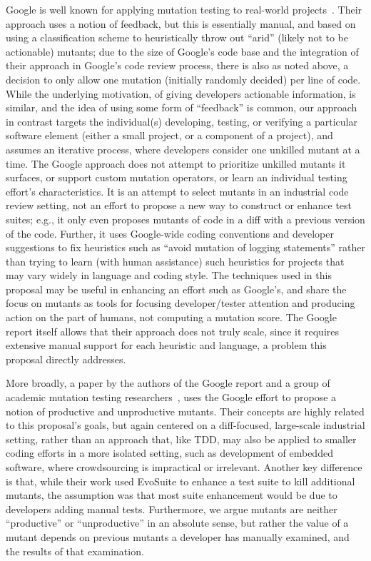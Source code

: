 Google is well known for applying mutation
testing to real-world projects~\cite{MutGoogle}.  Their approach 
uses a notion of feedback, but this is  essentially manual, and based on
using a classification scheme to heuristically throw out ``arid''
(likely not to be actionable)
mutants; due to the size of Google's code base and the integration of
their approach in Google's code review process, there is also as noted
above, a
decision to only allow one mutation (initially randomly decided) per
line of code.  While the underlying motivation, of giving developers
actionable information, is
similar, and the idea of using some form of ``feedback'' is common,
our approach in contrast targets the individual(s) developing, testing, or verifying a particular software
element (either a small project, or a component of a project), and
assumes an iterative process, where developers consider one unkilled
mutant at a time.  The Google approach does not attempt to prioritize
unkilled mutants it surfaces, or support custom mutation
operators, or learn an individual testing effort's characteristics.
It is an attempt to select mutants
in an industrial code review setting, not an effort to propose a
new way to construct or enhance test suites; e.g., it only even
proposes mutants of code in a diff with a previous version of the
code.  Further, it uses
Google-wide coding conventions and developer suggestions to fix
heuristics such as ``avoid mutation of logging statements'' rather
than trying to learn (with human assistance) such heuristics for
projects that may vary widely in language and coding style.
The techniques used in this proposal may be useful in enhancing an
effort such as Google's, and share the focus on mutants as
tools for focusing developer/tester attention and producing action on the
part of humans, not computing a mutation score.  The Google report
itself allows that their approach does not truly scale, since it
requires extensive manual support for each heuristic and language, a
problem this proposal directly addresses.

More broadly, a paper by the
authors of the Google report and a group of academic mutation testing
researchers~\cite{ivankovic2018industrial}, uses the Google effort to
propose a notion of productive and unproductive mutants.  Their
concepts are highly related to this proposal's goals, but again centered on a
diff-focused, large-scale industrial setting, rather than an approach
that, like TDD, may also be applied to smaller coding efforts in a more
isolated setting, such as development of embedded software, where
crowdsourcing is impractical or irrelevant.  Another key difference is that, while their
work used EvoSuite to enhance a test suite to kill additional mutants,
the assumption was that most suite enhancement would be due to
developers adding manual tests.  Furthermore, we argue mutants
are neither ``productive'' or ``unproductive'' in an absolute sense, but
rather the value of a mutant depends on previous mutants a
developer has manually examined, and the results of that examination.

